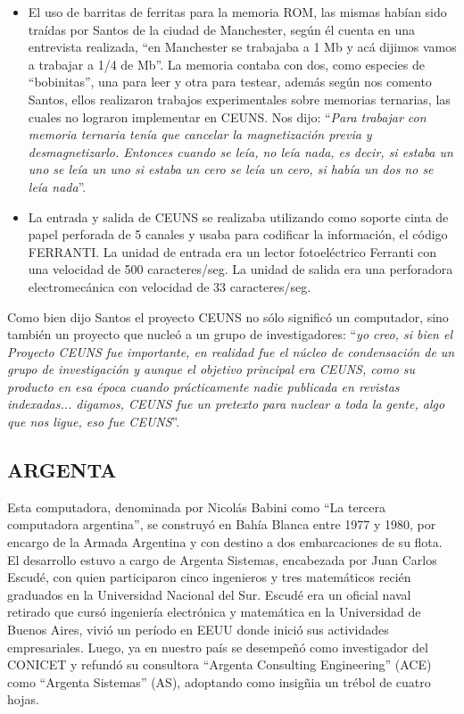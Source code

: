 \documentclass[%
 	final,
%
	notitlepage,
	narroweqnarray,
	inline,
 	twoside,
	]{ieee}
\begin{document}
\begin{itemize}
\item El uso de barritas de ferritas para la memoria ROM, las mismas hab\'ian sido tra\'idas por Santos de la ciudad de Manchester, seg\'un \'el cuenta en una entrevista realizada, ``en Manchester se trabajaba a 1 Mb y ac\'a dijimos vamos a trabajar a 1/4 de Mb''. La memoria contaba con dos, como especies de ``bobinitas'', una para leer y otra para testear, adem\'as seg\'un nos comento Santos, ellos realizaron trabajos experimentales sobre memorias ternarias, las cuales no lograron implementar en CEUNS. Nos dijo: ``\textit{Para trabajar con memoria ternaria ten\'ia que cancelar la magnetizaci\'on previa y desmagnetizarlo. Entonces cuando se le\'ia, no le\'ia nada, es decir, si estaba un uno se le\'ia un uno si estaba un cero se le\'ia un cero, si hab\'ia un dos no se le\'ia nada}''.\\
\item La entrada y salida de CEUNS se realizaba utilizando como soporte cinta de papel perforada de 5 canales y usaba para codificar la informaci\'on, el c\'odigo FERRANTI. La unidad de entrada era un lector fotoel\'ectrico Ferranti con una velocidad de 500 caracteres/seg. La unidad de salida era una perforadora electromec\'anica con velocidad de 33 caracteres/seg.\\
\end{itemize}

Como bien dijo Santos el proyecto CEUNS no s\'olo signific\'o un computador, sino tambi\'en un proyecto que nucle\'o a un grupo de investigadores:
``\textit{yo creo, si bien el Proyecto CEUNS fue importante, en realidad fue el n\'ucleo de condensaci\'on de un grupo de investigaci\'on y aunque el objetivo principal era CEUNS, como su producto en esa \'epoca cuando pr\'acticamente nadie publicada en revistas indexadas... digamos, CEUNS fue un pretexto para nuclear a toda la gente, algo que nos ligue, eso fue CEUNS}''.

\subsection*{ARGENTA}

Esta computadora, denominada por Nicol\'as Babini\cite{babini2} como ``La tercera computadora argentina'', se construy\'o en Bah\'ia Blanca entre 1977 y 1980, por encargo de la Armada Argentina y con destino a dos embarcaciones de su flota. El desarrollo estuvo a cargo de Argenta Sistemas, encabezada por Juan Carlos Escud\'e, con quien participaron cinco ingenieros y tres matem\'aticos reci\'en graduados en la Universidad Nacional del Sur. 
Escud\'e era un oficial naval retirado que curs\'o ingenier\'ia electr\'onica y matem\'atica en la Universidad de Buenos Aires, vivi\'o un per\'iodo en EEUU donde inici\'o sus actividades empresariales. Luego, ya en nuestro pa\'is se desempe\~n\'o como investigador del CONICET y refund\'o su consultora ``Argenta Consulting Engineering'' (ACE) como ``Argenta Sistemas'' (AS), adoptando como insig\~nia un tr\'ebol de cuatro hojas.
\end{document}
